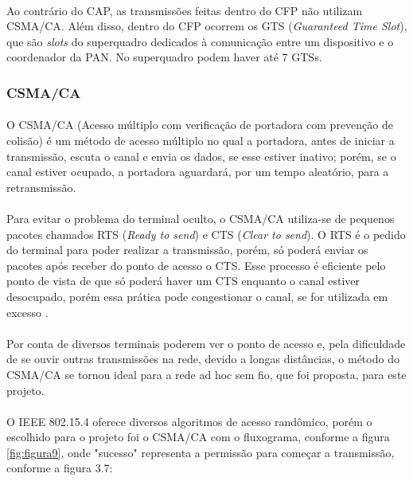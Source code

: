 \paragraph{} Ao contrário do CAP, as transmissões feitas dentro do CFP não utilizam CSMA/CA. Além disso, dentro do CFP ocorrem os GTS (\textit{Guaranteed Time Slot}), que são \textit{slots} do superquadro dedicados à comunicação entre um dispositivo e o coordenador da PAN. No superquadro podem haver até 7 GTSs.

\subsubsection{CSMA/CA}
\paragraph{} O CSMA/CA (Acesso múltiplo com verificação de portadora com prevenção de colisão) é um método de acesso múltiplo no qual a portadora, antes de iniciar a transmissão, escuta o canal e envia os dados, se esse estiver inativo; porém, se o canal estiver ocupado, a portadora aguardará, por um tempo aleatório, para a retransmissão.

\paragraph{} Para evitar o problema do terminal oculto, o CSMA/CA utiliza-se de pequenos pacotes chamados RTS (\textit{Ready to send}) e CTS (\textit{Clear to send}). O RTS é o pedido do terminal para poder realizar a transmissão, porém, só poderá enviar os pacotes após receber do ponto de acesso o CTS. Esse processo é eficiente pelo ponto de vista de que só poderá haver um CTS enquanto o canal estiver desocupado, porém essa prática pode congestionar o canal, se for utilizada em excesso \citep{Tanenbaum}.  

\paragraph{} Por conta de diversos terminais poderem ver o ponto de acesso e, pela dificuldade de se ouvir outras transmissões na rede, devido a longas distâncias, o método do CSMA/CA se tornou ideal para a rede ad hoc sem fio, que foi proposta, para este projeto.

\paragraph{} O IEEE 802.15.4 oferece diversos algoritmos de acesso randômico, porém o escolhido para o projeto foi o CSMA/CA com o fluxograma, conforme a figura \ref{fig:figura9}, onde "sucesso" representa a permissão para começar a transmissão, conforme a figura 3.7:

